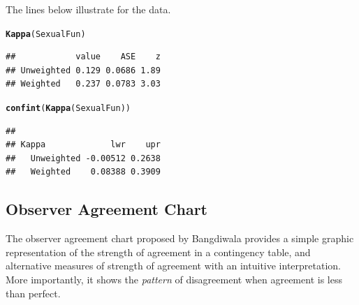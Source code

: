 \documentclass[11pt]{book}\usepackage[]{graphicx}\usepackage[]{color}
\makeatletter
\newcommand{\hlstd}[1]{\textcolor[rgb]{0.345,0.345,0.345}{#1}}%
\newcommand{\hlkwd}[1]{\textcolor[rgb]{0.737,0.353,0.396}{\textbf{#1}}}%
\newenvironment{kframe}{%
 \def\at@end@of@kframe{}%
 \ifinner\ifhmode%
  \def\at@end@of@kframe{\end{minipage}}%
  \begin{minipage}{\columnwidth}%
 \fi\fi%
 \def\FrameCommand##1{\hskip\@totalleftmargin \hskip-\fboxsep
 \colorbox{shadecolor}{##1}\hskip-\fboxsep
     \hskip-\linewidth \hskip-\@totalleftmargin \hskip\columnwidth}%
 \MakeFramed {\advance\hsize-\width
   \@totalleftmargin\z@ \linewidth\hsize
   \@setminipage}}%
 {\par\unskip\endMakeFramed%
 \at@end@of@kframe}
\newenvironment{knitrout}{}{} %
\renewenvironment{knitrout}{\small\renewcommand{\baselinestretch}{.85}}{} %
\makeatother
\begin{document}
The lines below illustrate  for the  data.
\begin{knitrout}
\color{fgcolor}\begin{kframe}
\begin{alltt}
\hlkwd{Kappa}\hlstd{(SexualFun)}
\end{alltt}
\begin{verbatim}
##            value    ASE    z
## Unweighted 0.129 0.0686 1.89
## Weighted   0.237 0.0783 3.03
\end{verbatim}
\begin{alltt}
\hlkwd{confint}\hlstd{(}\hlkwd{Kappa}\hlstd{(SexualFun))}
\end{alltt}
\begin{verbatim}
##             
## Kappa             lwr    upr
##   Unweighted -0.00512 0.2638
##   Weighted    0.08388 0.3909
\end{verbatim}
\end{kframe}
\end{knitrout}


\subsection[Observer Agreement Chart]{Observer Agreement Chart}
\label{sec:twoway:Bangdiwala}
The observer agreement chart proposed by Bangdiwala
\citeyearpar{Bangdiwala:1985,Bangdiwala:87} provides a simple
graphic representation of the strength of agreement in a contingency
table, and alternative measures of strength of agreement with an intuitive
interpretation. More importantly, it shows the \emph{pattern} of disagreement
when agreement is less than perfect.
\end{document}
